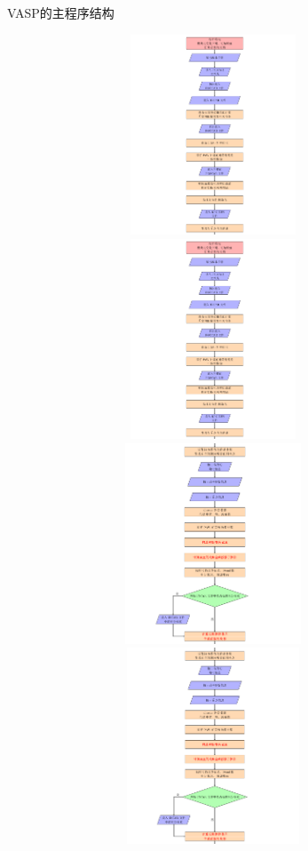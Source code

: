 \small
\begin{frame}[allowframebreaks]{\textrm{VASP}的主程序结构}
\begin{figure}[h!]
\vskip 10pt
\centering
\includegraphics[height=2.35in,width=4.0in,viewport=0 360 562 720,clip]{Figures/VASP_main_Flow-1.png}
\includegraphics[height=2.35in,width=4.0in,viewport=0 0 562 360,clip]{Figures/VASP_main_Flow-1.png}
\includegraphics[height=2.35in,width=4.0in,viewport=0 370 562 720,clip]{Figures/VASP_main_Flow-2.png}
\includegraphics[height=2.30in,width=4.0in,viewport=0 0 562 370,clip]{Figures/VASP_main_Flow-2.png}

\end{figure}
\end{frame}
